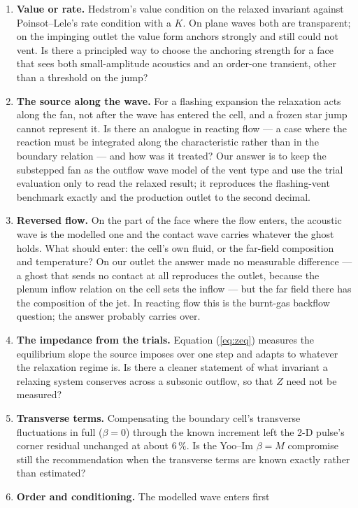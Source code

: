 \documentclass[11pt,a4paper]{article}
\begin{document}
\begin{enumerate}
\item \textbf{Value or rate.}  Hedstrom's value condition on the relaxed
invariant against Poinsot--Lele's rate condition with a $K$.  On plane
waves both are transparent; on the impinging outlet the value form
anchors strongly and still could not vent.  Is there a principled way to
choose the anchoring strength for a face that sees both small-amplitude
acoustics and an order-one transient, other than a threshold on the
jump?
\item \textbf{The source along the wave.}  For a flashing expansion the
relaxation acts along the fan, not after the wave has entered the cell,
and a frozen star jump cannot represent it.  Is there an analogue in
reacting flow --- a case where the reaction must be integrated along the
characteristic rather than in the boundary relation --- and how was it
treated?  Our answer is to keep the substepped fan as the outflow
wave model of the vent type and use the trial evaluation only to read
the relaxed result; it reproduces the flashing-vent benchmark exactly
and the production outlet to the second decimal.
\item \textbf{Reversed flow.}  On the part of the face where the flow
enters, the acoustic wave is the modelled one and the contact wave
carries whatever the ghost holds.  What should enter: the cell's
own fluid, or the far-field composition and temperature?  On our outlet
the answer made no measurable difference --- a ghost that sends no
contact at all reproduces the outlet, because the plenum inflow
relation on the cell sets the inflow --- but the far field there has
the composition of the jet.  In reacting flow this is the burnt-gas
backflow question; the answer probably carries over.
\item \textbf{The impedance from the trials.}  Equation (\ref{eq:zeq})
measures the equilibrium slope the source imposes over one step and
adapts to whatever the relaxation regime is.  Is there a cleaner
statement of what invariant a relaxing system conserves across a
subsonic outflow, so that $Z$ need not be measured?
\item \textbf{Transverse terms.}  Compensating the boundary cell's
transverse fluctuations in full ($\beta = 0$) through the known
increment left the 2-D pulse's corner residual unchanged at about
$6\,\%$.  Is the Yoo--Im $\beta = M$ compromise still the recommendation
when the transverse terms are known exactly rather than estimated?
\item \textbf{Order and conditioning.}  The modelled wave enters first

\end{enumerate}
\end{document}
